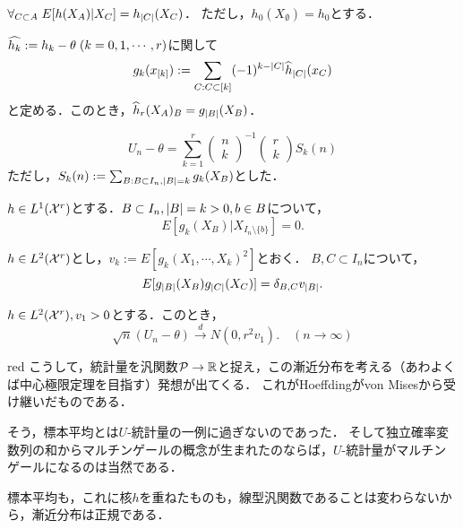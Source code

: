 \documentclass[uplatex,dvipdfmx]{jsreport}
\begin{document}
\begin{lemma}
    $\forall_{C\subset A}\;E[h(X_A)|X_C]=h_{\lvert C\rvert}(X_C)$．
    ただし，$h_0(X_{\emptyset})=h_0$とする．
\end{lemma}

\begin{definition}
    $\widehat{h_k}:=h_k-\theta\;(k=0,1,\cdots,r)$に関して
    \[g_k(x_{[k]}):=\sum_{C:C\subset[k]}(-1)^{k-\lvert C\rvert}\widehat{h}_{\lvert C\rvert}(x_C)\]
    と定める．このとき，$\widehat{h}_r(X_A)_B=g_{\lvert B\rvert}(X_B)$．
\end{definition}

\begin{lemma}[Hoeffdingの分解]
    \[U_n-\theta=\sum^r_{k=1}\begin{pmatrix}n\\k\end{pmatrix}^{-1}\begin{pmatrix}r\\k\end{pmatrix}S_k(n)\]
    ただし，$S_k(n):=\sum_{B:B\subset I_n,\lvert B\rvert=k}g_k(X_B)$とした．
\end{lemma}

\begin{lemma}[漸近分布の平均]
    $h\in L^1(\mathcal{X}^r)$とする．$B\subset I_n,\lvert B\rvert=k>0,b\in B$について，
    \[E[g_k(X_B)|X_{I_n\setminus\{b\}}]=0.\]
\end{lemma}

\begin{lemma}[漸近分布の分散]
    $h\in L^2(\mathcal{X}^r)$とし，$v_k:=E[g_k(X_1,\cdots,X_k)^2]$とおく．
    $B,C\subset I_n$について，
    \[E[g_{\lvert B\rvert}(X_B)g_{\lvert C\rvert}(X_C)]=\delta_{B,C}v_{\lvert B\rvert}.\]
\end{lemma}

\begin{theorem}[中心極限定理]
    $h\in L^2(\mathcal{X}^r),v_1>0$とする．このとき，
    \[\sqrt{n}(U_n-\theta)\xrightarrow{d}N(0,r^2v_1).\quad(n\to\infty)\]
\end{theorem}

\begin{tbox}{red}{}
    こうして，統計量を汎関数$\mathcal{P}\to\mathbb{R}$と捉え，この漸近分布を考える（あわよくば中心極限定理を目指す）発想が出てくる．
    これがHoeffdingがvon Misesから受け継いだものである．

    そう，標本平均とは$U$-統計量の一例に過ぎないのであった．
    そして独立確率変数列の和からマルチンゲールの概念が生まれたのならば，$U$-統計量がマルチンゲールになるのは当然である．

    標本平均も，これに核$h$を重ねたものも，線型汎関数であることは変わらないから，漸近分布は正規である．
\end{tbox}
\end{document}
